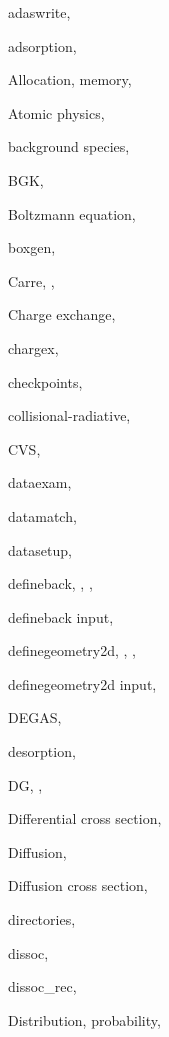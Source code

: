 \documentclass[12pt]{report}
\begin{document}
\begin{theindex}

  \item adaswrite, 
  \item adsorption, 
  \item Allocation, memory, 
  \item Atomic physics, 

  \indexspace

  \item background species, 
  \item BGK, 
  \item Boltzmann equation, 
  \item boxgen, 

  \indexspace

  \item Carre, , 
  \item Charge exchange, 
  \item chargex, 
  \item checkpoints, 
  \item collisional-radiative, 
  \item CVS, 

  \indexspace

  \item dataexam, 
  \item datamatch, 
  \item datasetup, 
  \item defineback, , , 
  \item defineback input, 
  \item definegeometry2d, , , 
  \item definegeometry2d input, 
  \item DEGAS, 
  \item desorption, 
  \item DG, , 
  \item Differential cross section, 
  \item Diffusion, 
  \item Diffusion cross section, 
  \item directories, 
  \item dissoc, 
  \item dissoc\_rec, 
  \item Distribution, probability, 


\end{theindex}
\end{document}
